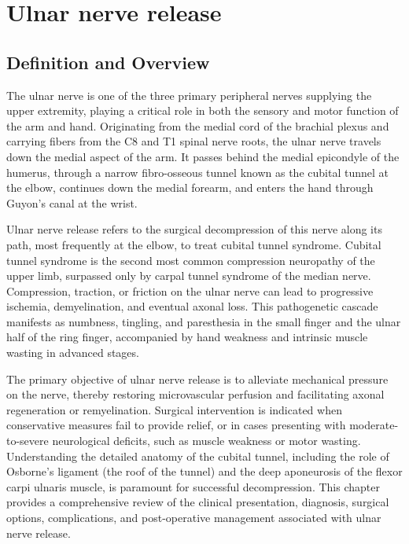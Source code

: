 \chapter{Ulnar nerve release}

\section*{Definition and Overview}
The ulnar nerve is one of the three primary peripheral nerves supplying the upper extremity, playing a critical role in both the sensory and motor function of the arm and hand. Originating from the medial cord of the brachial plexus and carrying fibers from the C8 and T1 spinal nerve roots, the ulnar nerve travels down the medial aspect of the arm. It passes behind the medial epicondyle of the humerus, through a narrow fibro-osseous tunnel known as the cubital tunnel at the elbow, continues down the medial forearm, and enters the hand through Guyon's canal at the wrist.

Ulnar nerve release refers to the surgical decompression of this nerve along its path, most frequently at the elbow, to treat cubital tunnel syndrome. Cubital tunnel syndrome is the second most common compression neuropathy of the upper limb, surpassed only by carpal tunnel syndrome of the median nerve. Compression, traction, or friction on the ulnar nerve can lead to progressive ischemia, demyelination, and eventual axonal loss. This pathogenetic cascade manifests as numbness, tingling, and paresthesia in the small finger and the ulnar half of the ring finger, accompanied by hand weakness and intrinsic muscle wasting in advanced stages.

The primary objective of ulnar nerve release is to alleviate mechanical pressure on the nerve, thereby restoring microvascular perfusion and facilitating axonal regeneration or remyelination. Surgical intervention is indicated when conservative measures fail to provide relief, or in cases presenting with moderate-to-severe neurological deficits, such as muscle weakness or motor wasting. Understanding the detailed anatomy of the cubital tunnel, including the role of Osborne's ligament (the roof of the tunnel) and the deep aponeurosis of the flexor carpi ulnaris muscle, is paramount for successful decompression. This chapter provides a comprehensive review of the clinical presentation, diagnosis, surgical options, complications, and post-operative management associated with ulnar nerve release.

